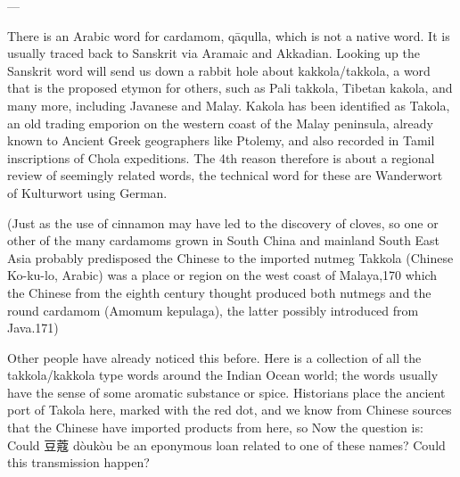 \documentclass[12pt]{article}
\begin{document}
---

There is an Arabic word for cardamom, qāqulla, which is not a native word. It is usually traced back to Sanskrit via Aramaic and Akkadian.
Looking up the Sanskrit word will send us down a rabbit hole about kakkola/takkola, a word that is the proposed etymon for others, such as Pali takkola, Tibetan kakola, and many more, including Javanese and Malay.
Kakola has been identified as Takola, an old trading emporion on the western coast of the Malay peninsula, already known to Ancient Greek geographers like Ptolemy, and also recorded in Tamil inscriptions of Chola expeditions.
The 4th reason therefore is about a regional review of seemingly related words, the technical word for these are Wanderwort of Kulturwort using German. 


(Just as the use of cinnamon may have led to the discovery of cloves, so one or other of the many cardamoms grown in South China and mainland South East Asia probably predisposed the Chinese to the imported nutmeg Takkola (Chinese Ko-ku-lo, Arabic) was a place or region on the west coast of Malaya,170 which the Chinese from the eighth century thought produced both nutmegs and the round cardamom (Amomum kepulaga), the latter possibly introduced from Java.171)



Other people have already noticed this before. Here is a collection of all the takkola/kakkola type words around the Indian Ocean world; the words usually have the sense of some aromatic substance or spice. 
Historians place the ancient port of Takola here, marked with the red dot, and we know from Chinese sources that the Chinese have imported products from here, so
Now the question is: Could 豆蔻 dòukòu be an eponymous loan related to one of these names? Could this transmission happen?






\printbibliography
\end{document}
